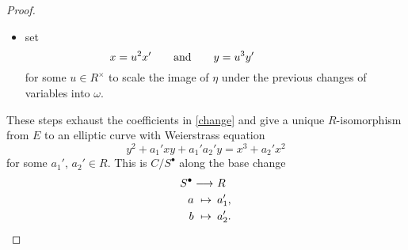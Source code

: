 \documentclass{gtpart}
\theoremstyle{definition}
\theoremstyle{remark}
\newcommand{\ad}{{\rm and}}
\newcommand{\s}{S^\bullet}
\numberwithin{equation}{section}
\numberwithin{thm}{section}
\begin{document}
\begin{proof}
\begin{itemize}
  \item set 
  \[
   x = u^2 x' \qquad \ad \qquad y = u^3 y' \qquad \qquad \quad ~~~
  \]
  for some $u \in R^\times$ to scale the image of $\eta$ under the 
  previous changes of variables into $\omega$.  
 \end{itemize}
 These steps exhaust the coefficients in \eqref{change} and give a 
 unique $R$-isomorphism from $E$ to an elliptic curve with Weierstrass 
 equation 
 \[
  y^2 + a_1' x y + a_1' a_2' y = x^3 + a_2' x^2 
 \]
 for some $a_1'$, $a_2' \in R$.  This is $C/\s$ along the base change 
 \begin{equation*}
 \begin{split}
      \s \longrightarrow & ~ R \\
  a ~ \mapsto \thinspace & ~ a_1', \\
  b ~ \mapsto \thinspace & ~ a_2'.  
 \end{split}
 \end{equation*}
\end{proof}
\end{document}
